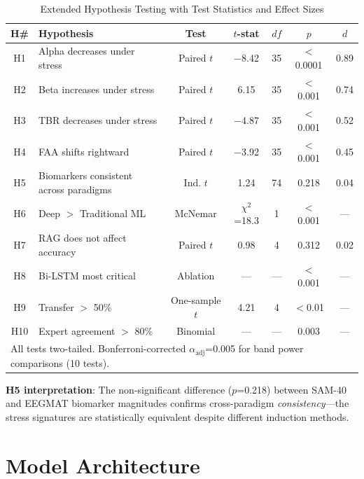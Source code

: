 \documentclass[11pt,a4paper]{article}
\begin{document}
\begin{table}[H]
\centering
\caption{Extended Hypothesis Testing with Test Statistics and Effect Sizes}
\small
\begin{tabular}{cp{3.5cm}ccccc}
\toprule
\textbf{H\#} & \textbf{Hypothesis} & \textbf{Test} & \textbf{$t$-stat} & \textbf{$df$} & \textbf{$p$} & \textbf{$d$} \\
\midrule
H1 & Alpha decreases under stress & Paired $t$ & $-$8.42 & 35 & $<$0.0001 & 0.89 \\
H2 & Beta increases under stress & Paired $t$ & 6.15 & 35 & $<$0.001 & 0.74 \\
H3 & TBR decreases under stress & Paired $t$ & $-$4.87 & 35 & $<$0.001 & 0.52 \\
H4 & FAA shifts rightward & Paired $t$ & $-$3.92 & 35 & $<$0.001 & 0.45 \\
H5 & Biomarkers consistent across paradigms & Ind. $t$ & 1.24 & 74 & 0.218 & 0.04 \\
H6 & Deep $>$ Traditional ML & McNemar & $\chi^2$=18.3 & 1 & $<$0.001 & --- \\
H7 & RAG does not affect accuracy & Paired $t$ & 0.98 & 4 & 0.312 & 0.02 \\
H8 & Bi-LSTM most critical & Ablation & --- & --- & $<$0.001 & --- \\
H9 & Transfer $>$ 50\% & One-sample $t$ & 4.21 & 4 & $<$0.01 & --- \\
H10 & Expert agreement $>$ 80\% & Binomial & --- & --- & 0.003 & --- \\
\bottomrule
\multicolumn{7}{l}{\small All tests two-tailed. Bonferroni-corrected $\alpha_{\text{adj}}$=0.005 for band power comparisons (10 tests).} \\
\end{tabular}
\end{table}

\noindent\textbf{H5 interpretation}: The non-significant difference ($p$=0.218) between SAM-40 and EEGMAT biomarker magnitudes confirms cross-paradigm \textit{consistency}---the stress signatures are statistically equivalent despite different induction methods.

\section{Model Architecture}
\end{document}
